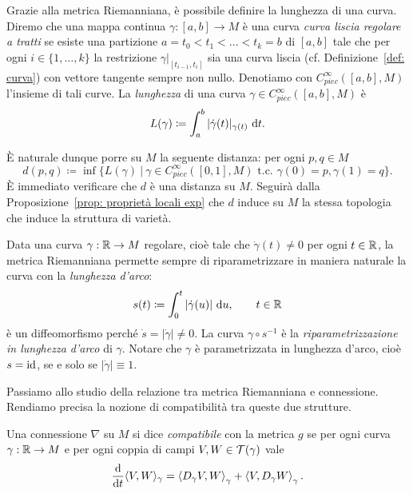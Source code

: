 	Grazie alla metrica Riemanniana, è possibile definire la lunghezza di una curva. Diremo che una mappa continua \(\gamma:[a,b] \to M\) è una curva \textit{curva liscia regolare a tratti} se esiste una partizione \(a=t_0<t_1< \dots < t_k=b\) di \([a,b]\) tale che per ogni \(i \in \{1,\dots, k\}\) la restrizione \(\gamma|_{[t_{i-1},t_i]}\) sia una curva liscia (cf. Definizione~\ref{def: curva}) con vettore tangente sempre non nullo. Denotiamo con \(C^\infty_{piec}([a,b],M)\) l'insieme di tali curve. La \textit{lunghezza} di una curva \(\gamma \in C^\infty_{piec}([a,b],M)\) è 
	\begin{equation}\label{eq: funzionale lunghezza}
	L(\gamma) \coloneq \int_a^b |\dot \gamma(t) |_{\gamma(t)} \ \mathrm{d} t. 
	\end{equation}
	
	È naturale dunque porre su \(M\) la seguente distanza: per ogni \(p,q \in M\)
	\[
	d(p,q) \coloneq \inf\{L(\gamma) \ | \ \gamma \in C^\infty_{piec}([0,1],M) \text{ t.c. } \gamma(0)= p, \gamma(1)=q\}.
	\]
	È immediato verificare che \(d\) è una distanza su \(M\). Seguirà dalla Proposizione~\ref{prop: proprietà locali exp} che \(d\) induce su \(M\) la stessa topologia che induce la struttura di varietà.
		
	
	
	Data una curva \(\gamma: \mathbb{R} \to M\) regolare, cioè tale che \(\dot \gamma(t) \neq 0\) per ogni \(t \in \mathbb{R}\), la metrica Riemanniana permette sempre di riparametrizzare in maniera naturale la curva con la \textit{lunghezza d'arco}:
	\[
		s(t) \coloneq \int_0^t |\dot \gamma(u)| \ \mathrm{d} u, \qquad t \in \mathbb{R}
	\]
	è un diffeomorfismo perché \(\dot s = |\dot \gamma| \neq 0\). La curva \(\gamma \circ s^{-1}\) è la \textit{riparametrizzazione in lunghezza d'arco} di \(\gamma\). Notare che \(\gamma\)  è parametrizzata in lunghezza d'arco, cioè \(s = \mathrm{id}\), se e solo se \(|\dot \gamma | \equiv 1\).
	
	
	Passiamo allo studio della relazione tra metrica Riemanniana e connessione. Rendiamo precisa la nozione di compatibilità tra queste due strutture.
	\begin{defi}
		Una connessione \(\nabla\) su \(M\) si dice \textit{compatibile} con la metrica \(g\) se per ogni curva \(\gamma:\mathbb{R} \to M\) e per ogni coppia di campi \(V,W \in \mathcal{T}(\gamma)\) vale 
		\[
		\frac{\mathrm{d}}{\mathrm{d} t} \langle V,W\rangle_\gamma = \left\langle D_\gamma V, W \right\rangle_\gamma + \left\langle V, D_\gamma W \right\rangle_\gamma.
		\]
	\end{defi}

